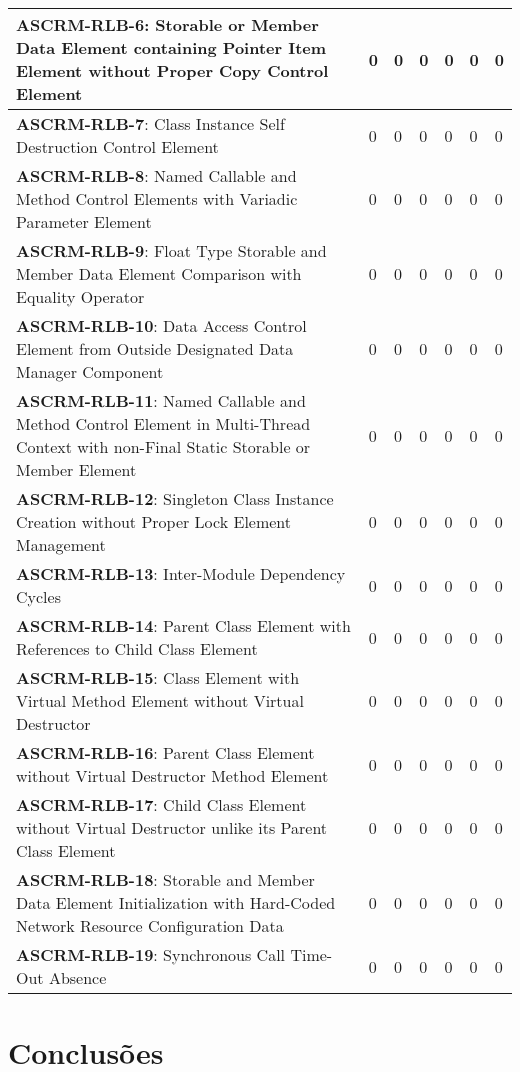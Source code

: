 \documentclass[openany,10pt,a4paper]{article}
\begin{document}
\begin{table}[h]
\begin{tabular}{|p{3in}|p{0.3in}|p{0.3in}|p{0.3in}|p{0.3in}|p{0.3in}|p{0.4in}|}
\textbf{ASCRM-RLB-6}: Storable or Member Data Element containing Pointer Item Element without Proper Copy Control Element & 0 & 0 & 0 & 0 & 0 & 0 \\ \hline
\textbf{ASCRM-RLB-7}: Class Instance Self Destruction Control Element & 0 & 0 & 0 & 0 & 0 & 0 \\ \hline
\textbf{ASCRM-RLB-8}: Named Callable and Method Control Elements with Variadic Parameter Element & 0 & 0 & 0 & 0 & 0 & 0 \\ \hline
\textbf{ASCRM-RLB-9}: Float Type Storable and Member Data Element Comparison with Equality Operator & 0 & 0 & 0 & 0 & 0 & 0 \\ \hline
\textbf{ASCRM-RLB-10}: Data Access Control Element from Outside Designated Data Manager Component & 0 & 0 & 0 & 0 & 0 & 0 \\ \hline
\textbf{ASCRM-RLB-11}: Named Callable and Method Control Element in Multi-Thread Context with non-Final Static Storable or Member Element & 0 & 0 & 0 & 0 & 0 & 0 \\ \hline
\textbf{ASCRM-RLB-12}: Singleton Class Instance Creation without Proper Lock Element Management & 0 & 0 & 0 & 0 & 0 & 0 \\ \hline
\textbf{ASCRM-RLB-13}: Inter-Module Dependency Cycles & 0 & 0 & 0 & 0 & 0 & 0 \\ \hline
\textbf{ASCRM-RLB-14}: Parent Class Element with References to Child Class Element & 0 & 0 & 0 & 0 & 0 & 0 \\ \hline
\textbf{ASCRM-RLB-15}: Class Element with Virtual Method Element without Virtual Destructor & 0 & 0 & 0 & 0 & 0 & 0 \\ \hline
\textbf{ASCRM-RLB-16}: Parent Class Element without Virtual Destructor Method Element & 0 & 0 & 0 & 0 & 0 & 0 \\ \hline
\textbf{ASCRM-RLB-17}: Child Class Element without Virtual Destructor unlike its Parent Class Element & 0 & 0 & 0 & 0 & 0 & 0 \\ \hline
\textbf{ASCRM-RLB-18}: Storable and Member Data Element Initialization with Hard-Coded Network Resource Configuration Data & 0 & 0 & 0 & 0 & 0 & 0 \\ \hline
\textbf{ASCRM-RLB-19}: Synchronous Call Time-Out Absence & 0 & 0 & 0 & 0 & 0 & 0 \\ \hline
	\end{tabular} 
	\label{tab:tabela1}
\end{table}

\section{Conclusões}
\end{document}
